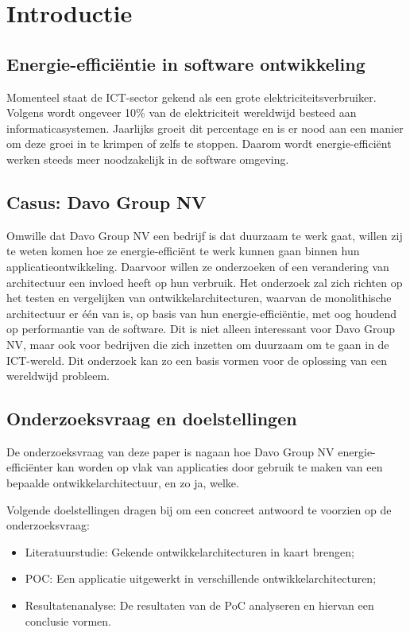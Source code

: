 
\section{Introductie}%
\label{sec:introductie}
\subsection{Energie-efficiëntie in software ontwikkeling}
Momenteel staat de ICT-sector gekend als een grote elektriciteitsverbruiker. Volgens \textcite{Gelenbe2023} wordt ongeveer 10\% van de elektriciteit wereldwijd besteed aan informaticasystemen. Jaarlijks groeit dit percentage en is er nood aan een manier om deze groei in te krimpen of zelfs te stoppen. Daarom wordt energie-efficiënt werken steeds meer noodzakelijk in de software omgeving.  

\subsection{Casus: Davo Group NV}
Omwille dat Davo Group NV een bedrijf is dat duurzaam te werk gaat, willen zij te weten komen hoe ze energie-efficiënt te werk kunnen gaan binnen hun applicatieontwikkeling. Daarvoor willen ze onderzoeken of een verandering van architectuur een invloed heeft op hun verbruik. Het onderzoek zal zich richten op het testen en vergelijken van ontwikkelarchitecturen, waarvan de monolithische architectuur er één van is, op basis van hun energie-efficiëntie, met oog houdend op performantie van de software. Dit is niet alleen interessant voor Davo Group NV, maar ook voor bedrijven die zich inzetten om duurzaam om te gaan in de ICT-wereld. Dit onderzoek kan zo een basis vormen voor de oplossing van een wereldwijd probleem.


\subsection{Onderzoeksvraag en doelstellingen}
De onderzoeksvraag van deze paper is nagaan hoe Davo Group NV energie-efficiënter kan worden op vlak van applicaties door gebruik te maken van een bepaalde ontwikkelarchitectuur, en zo ja, welke.

Volgende doelstellingen dragen bij om een concreet antwoord te voorzien op de onderzoeksvraag:

\begin{itemize}
    \item Literatuurstudie: Gekende ontwikkelarchitecturen in kaart brengen;
    \item POC: Een applicatie uitgewerkt in verschillende ontwikkelarchitecturen;
    \item Resultatenanalyse: De resultaten van de PoC analyseren en hiervan een conclusie vormen.
\end{itemize}

